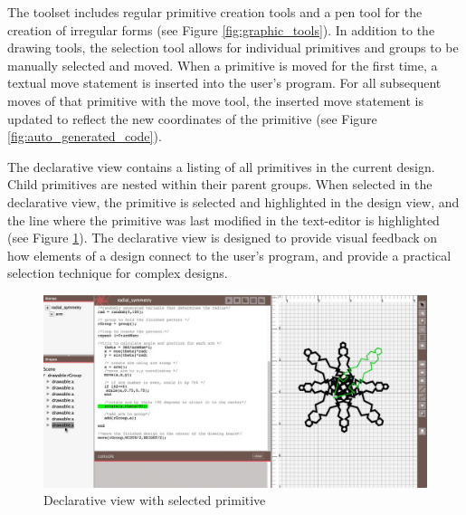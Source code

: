 \documentclass{sigchi}
\begin{document}
The toolset includes regular primitive creation tools and a pen tool for the creation of irregular forms (see Figure \ref{fig:graphic_tools}).  In addition to the drawing tools, the selection tool allows for individual primitives and groups to be manually selected and moved. When a primitive is moved for the first time, a textual move statement is inserted into the user's program. For all subsequent moves of that primitive with the move tool, the inserted move statement is updated to reflect the new coordinates of the primitive (see Figure \ref{fig:auto_generated_code}).


The declarative view contains a listing of all primitives in the current design. Child primitives are nested within their parent groups. When selected in the declarative view, the primitive is selected and highlighted in the design view, and the line where the primitive was last modified in the text-editor is highlighted (see Figure \ref{fig:declarative_view}). The declarative view is designed to provide visual feedback on how elements of a design connect to the user's program, and provide a practical selection technique for complex designs.

\begin{center}
\begin{figure}[h!]
\includegraphics[width=\columnwidth]{images/selection_mechanism.jpg}
\caption{Declarative view with selected primitive}
\label{fig:declarative_view}
\end{figure}
\end{center}
\vspace{-20pt}
\end{document}
